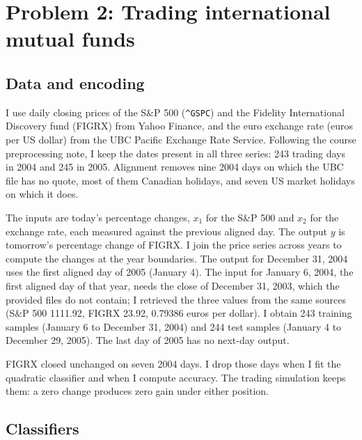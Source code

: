 
\section*{Problem 2: Trading international mutual funds}

\subsection*{Data and encoding}
I use daily closing prices of the S\&P 500 (\texttt{\^{}GSPC}) and the Fidelity International Discovery fund
(FIGRX) from Yahoo Finance, and the euro exchange rate (euros per US dollar) from the UBC Pacific Exchange Rate
Service. Following the course preprocessing note, I keep the dates present in all three series: 243 trading days in
2004 and 245 in 2005. Alignment removes nine 2004 days on which the UBC file has no quote, most of them Canadian
holidays, and seven US market holidays on which it does.

The inputs are today's percentage changes, $x_1$ for the S\&P 500 and $x_2$ for the exchange rate, each measured
against the previous aligned day. The output $y$ is tomorrow's percentage change of FIGRX. I join the price series
across years to compute the changes at the year boundaries. The output for December 31, 2004 uses the first aligned
day of 2005 (January 4). The input for January 6, 2004, the first aligned day of that year, needs the close of
December 31, 2003, which the provided files do not contain; I retrieved the three values from the same sources
(S\&P 500 1111.92, FIGRX 23.92, 0.79386 euros per dollar). I obtain 243 training samples (January 6 to
December 31, 2004) and 244 test samples (January 4 to December 29, 2005). The last day of 2005 has no next-day
output.

FIGRX closed unchanged on seven 2004 days. I drop those days when I fit the quadratic classifier and when I
compute accuracy. The trading simulation keeps them: a zero change produces zero gain under either position.

\subsection*{Classifiers}
